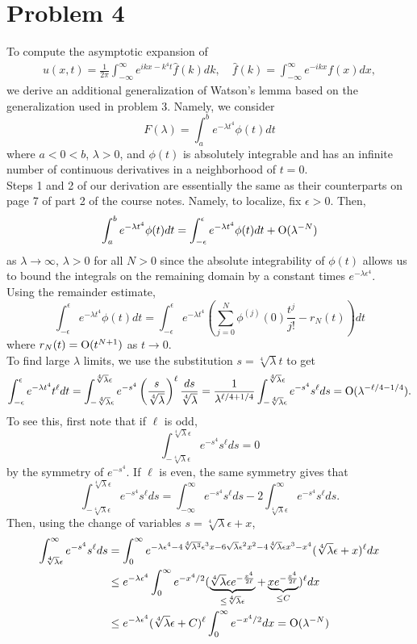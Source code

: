 \documentclass{article}
\begin{document}
\section{Problem 4}
To compute the asymptotic expansion of
\begin{align*}
	u(x,t) = \frac{1}{2 \pi} \int_{-\infty}^\infty e^{i k x - k^4 t} \hat f(k) d k, \quad \hat f(k) = \int_{-\infty}^\infty e^{-i k x} f(x) d x,
\end{align*}
we derive an additional generalization of Watson's lemma based on the generalization used in problem 3. Namely, we consider 
\[
F(\lambda)=\int_a^b e^{-\lambda t^4}\phi(t)dt
\]
where $a<0<b$, $\lambda>0$, and $\phi(t)$ is absolutely integrable and has an infinite number of continuous derivatives in a neighborhood of $t=0$.\\
Steps 1 and 2 of our derivation are essentially the same as their counterparts on page 7 of part 2 of the course notes. Namely, to localize, fix $\epsilon>0$. Then,
\[
\int_a^b e^{-\lambda t^4}\phi(t)dt=\int_{-\epsilon}^\epsilon e^{-\lambda t^4}\phi(t)dt+\operatorname{O}(\lambda^{-N})
\]
as $\lambda\to\infty$, $\lambda>0$ for all $N>0$ since the absolute integrability of $\phi(t)$ allows us to bound the integrals on the remaining domain by a constant times $e^{-\lambda\epsilon^4}$.\\
Using the remainder estimate, 
\[
\int_{-\epsilon}^\epsilon e^{-\lambda t^4}\phi(t)dt=\int_{-\epsilon}^\epsilon e^{-\lambda t^4}\left(\sum_{j=0}^N\phi^{(j)}(0)\frac{t^j}{j!}-r_N(t)\right)dt
\]
where $r_N(t)=\operatorname{O}(t^{N+1})$ as $t\to0$. \\
To find large $\lambda$ limits, we use the substitution $s=\sqrt[4]{\lambda}t$ to get
\[
\int_{-\epsilon}^\epsilon e^{-\lambda t^4}t^\ell dt=\int_{-\sqrt[4]{\lambda}\epsilon}^{\sqrt[4]{\lambda}\epsilon} e^{-s^4}\left(\frac{s}{\sqrt[4]{\lambda}}\right)^\ell\frac{ds}{\sqrt[4]{\lambda}}=\frac{1}{\lambda^{\ell/4+1/4}}\int_{-\sqrt[4]{\lambda}\epsilon}^{\sqrt[4]{\lambda}\epsilon} e^{-s^4}s^\ell ds=\operatorname{O}(\lambda^{-\ell/4-1/4}).
\]
To see this, first note that if $\ell$ is odd, 
\[
\int_{-\sqrt[4]{\lambda}\epsilon}^{\sqrt[4]{\lambda}\epsilon} e^{-s^4}s^\ell ds=0
\] 
by the symmetry of $e^{-s^4}$. If $\ell$ is even, the same symmetry gives that 
\[
\int_{-\sqrt[4]{\lambda}\epsilon}^{\sqrt[4]{\lambda}\epsilon} e^{-s^4}s^\ell ds=\int_{-\infty}^{\infty} e^{-s^4}s^\ell ds-2\int_{\sqrt[4]{\lambda}\epsilon}^{\infty} e^{-s^4}s^\ell ds.
\]
Then, using the change of variables $s=\sqrt[4]{\lambda}\epsilon+x$,
\begin{align*}
\int_{\sqrt[4]{\lambda}\epsilon}^{\infty} e^{-s^4}s^\ell ds&=\int_0^\infty e^{-\lambda\epsilon^4-4\sqrt[4]{\lambda^3}\epsilon^3x-6\sqrt{\lambda}\epsilon^2x^2-4\sqrt[4]{\lambda}\epsilon x^3-x^4}(\sqrt[4]{\lambda}\epsilon+x)^\ell dx\\&\leq
e^{-\lambda\epsilon^4}\int_0^\infty e^{-x^4/2}(\underbrace{\sqrt[4]{\lambda}\epsilon e^{-\frac{x^4}{2\ell}}}_{\leq \sqrt[4]{\lambda}\epsilon}+\underbrace{xe^{-\frac{x^4}{2\ell}}}_{\leq C})^\ell dx\\&\leq e^{-\lambda\epsilon^4}(\sqrt[4]{\lambda}\epsilon+C)^\ell\int_0^\infty e^{-x^4/2}dx=\operatorname{O}(\lambda^{-N})
\end{align*}
\end{document}
